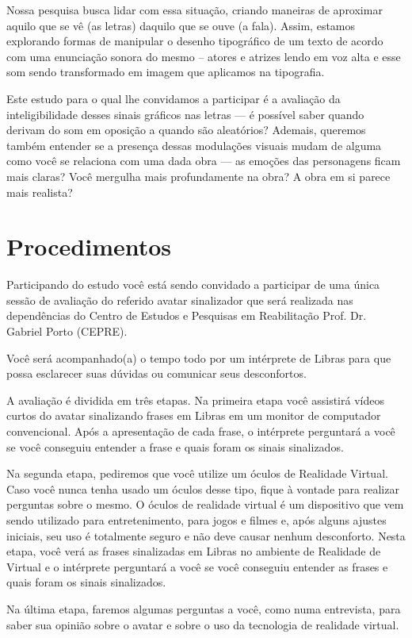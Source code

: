 \documentclass[a4paper,11pt,titlepage,singlespacing]{article}
\begin{document}
Nossa pesquisa busca lidar com essa situação, criando maneiras de aproximar aquilo que se vê (as letras) daquilo que se ouve (a fala). Assim, estamos explorando formas de manipular o desenho tipográfico de um texto de acordo com uma enunciação sonora do mesmo – atores e atrizes lendo em voz alta e esse som sendo transformado em imagem que aplicamos na tipografia.

Este estudo para o qual lhe convidamos a participar é a avaliação da inteligibilidade desses sinais gráficos nas letras — é possível saber quando derivam do som em oposição a quando são aleatórios? Ademais, queremos também entender se a presença dessas modulações visuais mudam de alguma como você se relaciona com uma dada obra — as emoções das personagens ficam mais claras? Você mergulha mais profundamente na obra? A obra em si parece mais realista?

\section*{Procedimentos}

Participando do estudo você está sendo convidado a participar de uma única sessão de avaliação do referido avatar sinalizador que será realizada nas dependências do Centro de Estudos e Pesquisas em Reabilitação Prof. Dr. Gabriel Porto (CEPRE).

Você será acompanhado(a) o tempo todo por um intérprete de Libras para que possa esclarecer suas dúvidas ou comunicar seus desconfortos.

A avaliação é dividida em três etapas. Na primeira etapa você assistirá vídeos curtos do avatar sinalizando frases em Libras em um monitor de computador convencional. Após a apresentação de cada frase, o intérprete perguntará a você se você conseguiu entender a frase e quais foram os sinais sinalizados.

Na segunda etapa, pediremos que você utilize um óculos de Realidade Virtual. Caso você nunca tenha usado um óculos desse tipo, fique à vontade para realizar perguntas sobre o mesmo. O óculos de realidade virtual é um dispositivo que vem sendo utilizado para entretenimento, para jogos e filmes e, após alguns ajustes iniciais, seu uso é totalmente seguro e não deve causar nenhum desconforto. Nesta etapa, você verá as frases sinalizadas em Libras no ambiente de Realidade de Virtual e o intérprete perguntará a você se você conseguiu entender as frases e quais foram os sinais sinalizados.

Na última etapa, faremos algumas perguntas a você, como numa entrevista, para saber sua opinião sobre o avatar e sobre o uso da tecnologia de realidade virtual.
\end{document}
